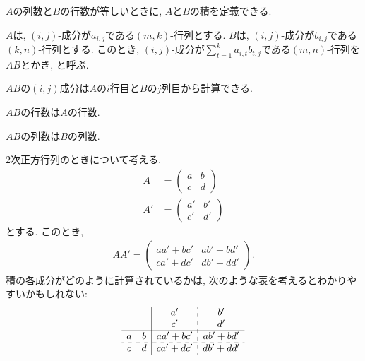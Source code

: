 $A$の列数と$B$の行数が等しいときに,
$A$と$B$の積を定義できる.
\begin{definition}
  \label{def:op:prod}
  $A$は, $(i,j)$-成分が$a_{i,j}$である$(m,k)$-行列とする.
  $B$は, $(i,j)$-成分が$b_{i,j}$である$(k,n)$-行列とする.
  このとき,
  $(i,j)$-成分が$\sum_{t=1}^{k}a_{i,t}b_{t,j}$である$(m,n)$-行列を$AB$とかき,
  と呼ぶ. 
\end{definition}
\begin{remark}
  $AB$の$(i,j)$成分は$A$の$i$行目と$B$の$j$列目から計算できる.
\end{remark}
\begin{remark}
  $AB$の行数は$A$の行数.
\end{remark}
\begin{remark}
  $AB$の列数は$B$の列数.
\end{remark}



\begin{example}
$2$次正方行列のときについて考える.
  \begin{align*}
  A&=
  \begin{pmatrix}
    a&b\\c&d
  \end{pmatrix}\\
  A'&=
  \begin{pmatrix}
    a'&b'\\c'&d'
  \end{pmatrix}
\end{align*}
とする.
このとき,
\begin{align*}
  AA'=
  \begin{pmatrix}
    aa'+bc'&ab'+bd'\\ca'+dc'&db'+dd'
  \end{pmatrix}.
\end{align*}
積の各成分がどのように計算されているかは,
次のような表を考えるとわかりやすいかもしれない:
\begin{align*}
  \begin{array}{cc|c:c}
   && a'&b'\\
    && c'&d'\\\hline
    a&b&aa'+bc'&ab'+bd'\\\hdashline
    c&d&ca'+dc'&db'+dd'
  \end{array}
\end{align*}
\end{example}



